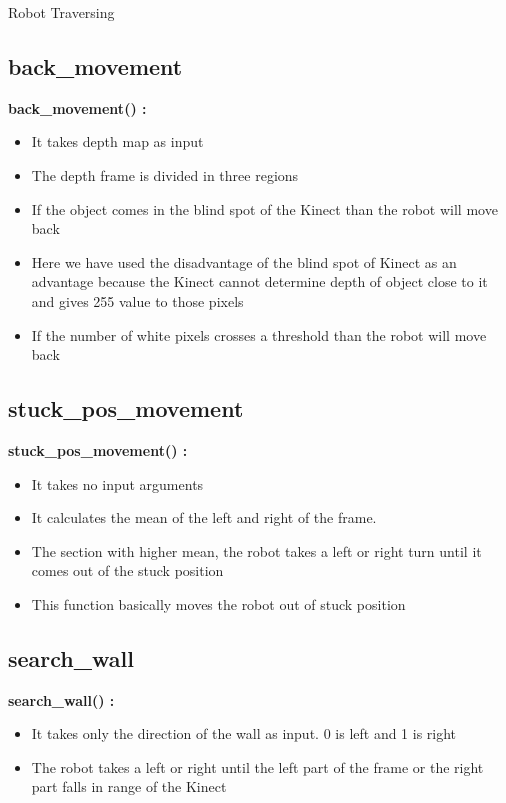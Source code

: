 \documentclass[10pt, a4paper]{beamer}
\begin{document}
\begin{frame}[allowframebreaks]{Robot Traversing}
  \subsection{back\_movement}
    \textbf{back\_movement() : }
      \begin{itemize}
       \item It takes depth map as input
       \item The depth frame is divided in three regions
       \item If the object comes in the blind spot of the Kinect than the robot will move back
       \item Here we have used the disadvantage of the blind spot of Kinect as an advantage because the Kinect cannot determine depth of object close to it and gives 255 value to those pixels
       \item If the number of white pixels crosses a threshold than the robot will move back
      \end{itemize}
   \framebreak
  \subsection{stuck\_pos\_movement}
    \textbf{stuck\_pos\_movement() : }
      \begin{itemize}
       \item It takes no input arguments
       \item It calculates the mean of the left and right of the frame. 
       \item The section with higher mean, the robot takes a left or right turn until it comes out of the stuck position
       \item This function basically moves the robot out of stuck position
      \end{itemize}
  \framebreak
  \subsection{search\_wall}
    \textbf{search\_wall() : }
      \begin{itemize}
       \item It takes only the direction of the wall as input. 0 is left and 1 is right
       \item The robot takes a left or right until the left part of the frame or the right part falls in range of the Kinect
      \end{itemize}
\end{frame}
\end{document}
